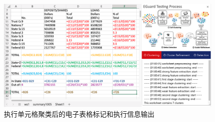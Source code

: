 \begin{figure}[tbp]    
    \centering
    \includegraphics[width=\textwidth]{figure/eg/eguard-2.png}
    \caption{\eg 执行单元格聚类后的电子表格标记和执行信息输出}
    \label{figure-eg2}
\end{figure}